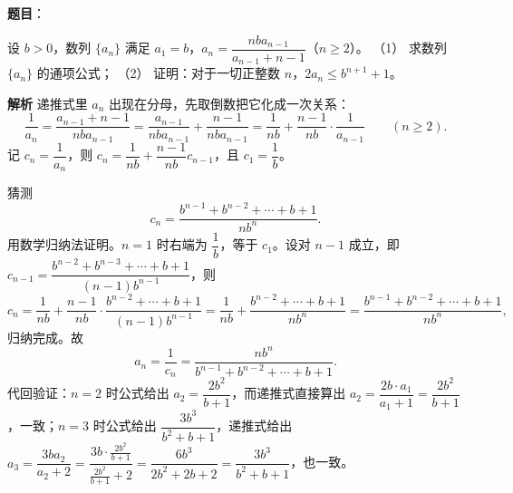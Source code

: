 \begin{answer}

\end{answer}
\begin{answer}

\textbf{题目}：

设 $b>0$，数列 $\{a_n\}$ 满足 $a_1=b$，$a_n=\dfrac{nba_{n-1}}{a_{n-1}+n-1}$（$n\geqslant2$）。
（1） 求数列 $\{a_n\}$ 的通项公式；
（2） 证明：对于一切正整数 $n$，$2a_n\leqslant b^{n+1}+1$。

\textbf{解析}
递推式里 $a_n$ 出现在分母，先取倒数把它化成一次关系：
\nopagebreak[4]
\[
\frac{1}{a_n}=\frac{a_{n-1}+n-1}{nba_{n-1}}=\frac{a_{n-1}}{nba_{n-1}}+\frac{n-1}{nba_{n-1}}=\frac{1}{nb}+\frac{n-1}{nb}\cdot\frac{1}{a_{n-1}}\qquad(n\geqslant2).
\]
记 $c_n=\dfrac{1}{a_n}$，则 $c_n=\dfrac1{nb}+\dfrac{n-1}{nb}c_{n-1}$，且 $c_1=\dfrac1b$。

猜测
\nopagebreak[4]
\[
c_n=\frac{b^{n-1}+b^{n-2}+\cdots+b+1}{nb^n}.
\]
用数学归纳法证明。$n=1$ 时右端为 $\dfrac{1}{b}$，等于 $c_1$。设对 $n-1$ 成立，即 $c_{n-1}=\dfrac{b^{n-2}+b^{n-3}+\cdots+b+1}{(n-1)b^{n-1}}$，则
\nopagebreak[4]
\[
c_n=\frac{1}{nb}+\frac{n-1}{nb}\cdot\frac{b^{n-2}+\cdots+b+1}{(n-1)b^{n-1}}
=\frac{1}{nb}+\frac{b^{n-2}+\cdots+b+1}{nb^{n}}
=\frac{b^{n-1}+b^{n-2}+\cdots+b+1}{nb^{n}},
\]
归纳完成。故
\nopagebreak[4]
\[
a_n=\frac{1}{c_n}=\frac{nb^n}{b^{n-1}+b^{n-2}+\cdots+b+1}.
\]
代回验证：$n=2$ 时公式给出 $a_2=\dfrac{2b^2}{b+1}$，而递推式直接算出 $a_2=\dfrac{2b\cdot a_1}{a_1+1}=\dfrac{2b^2}{b+1}$，一致；$n=3$ 时公式给出 $\dfrac{3b^3}{b^2+b+1}$，递推式给出 $a_3=\dfrac{3ba_2}{a_2+2}=\dfrac{3b\cdot\frac{2b^2}{b+1}}{\frac{2b^2}{b+1}+2}=\dfrac{6b^3}{2b^2+2b+2}=\dfrac{3b^3}{b^2+b+1}$，也一致。


\end{answer}
